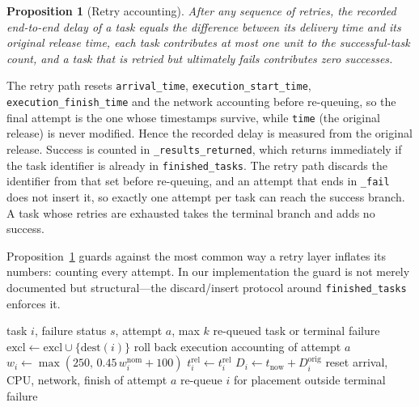 \documentclass[journal,10pt]{IEEEtran}
\newtheorem{proposition}{Proposition}
\begin{document}
\begin{proposition}[Retry accounting]
\label{prop:account}
After any sequence of retries, the recorded end-to-end delay of a task equals
the difference between its delivery time and its \emph{original} release time,
each task contributes at most one unit to the successful-task count, and a task
that is retried but ultimately fails contributes zero successes.
\end{proposition}

\begin{IEEEproof}
The retry path resets \texttt{arrival\_time}, \texttt{execution\_start\_time},
\texttt{execution\_finish\_time} and the network accounting before re-queuing,
so the final attempt is the one whose timestamps survive, while
\texttt{time} (the original release) is never modified. Hence the recorded delay
is measured from the original release. Success is counted in
\texttt{\_results\_returned}, which returns immediately if the task identifier is
already in \texttt{finished\_tasks}. The retry path discards the identifier from
that set before re-queuing, and an attempt that ends in \texttt{\_fail} does not
insert it, so exactly one attempt per task can reach the success branch. A task
whose retries are exhausted takes the terminal branch and adds no success.
\end{IEEEproof}

Proposition~\ref{prop:account} guards against the most common way a retry layer
inflates its numbers: counting every attempt. In our implementation the guard is
not merely documented but structural---the discard/insert protocol around
\texttt{finished\_tasks} enforces it.

\begin{algorithm}[t]
\caption{Retry with exclusion and checkpoint resume}
\label{alg:retry}
\begin{algorithmic}[1]
\Require task $i$, failure status $s$, attempt $a$, max $k$
\Ensure re-queued task or terminal failure
  \State $\text{excl}\gets\text{excl}\cup\{\text{dest}(i)\}$
  \State roll back execution accounting of attempt $a$
  \State $w_i\gets\max(250,\,0.45\,w_i^{\text{nom}}+100)$
  \State $t^{\text{rel}}_i\gets t^{\text{rel}}_i$ 
  \State $D_i\gets t_{\text{now}}+D_i^{\text{orig}}$
  \State reset arrival, CPU, network, finish of attempt $a$
  \State re-queue $i$ for placement outside 
\Else
  \State \Return terminal failure
\EndIf
\end{algorithmic}
\end{algorithm}
\end{document}
